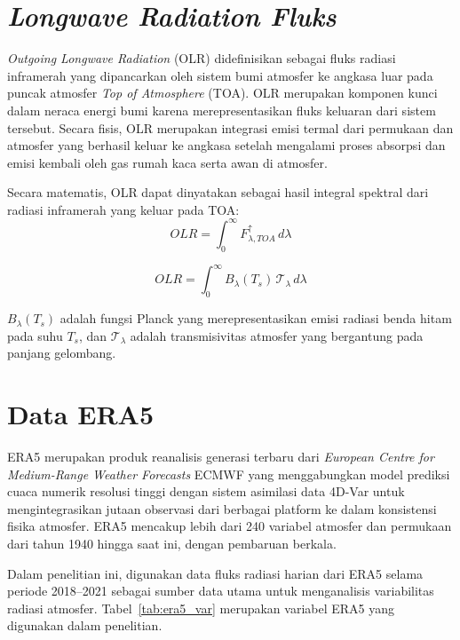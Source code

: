\documentclass[12pt,a4paper]{report}
\begin{document}
\section{\textit{Longwave Radiation Fluks}}

 
\textit{Outgoing Longwave Radiation} (OLR) didefinisikan sebagai fluks radiasi inframerah yang dipancarkan oleh sistem bumi atmosfer ke angkasa luar pada puncak atmosfer \textit{Top of Atmosphere} (TOA). OLR merupakan komponen kunci dalam neraca energi bumi karena merepresentasikan fluks keluaran dari sistem tersebut. Secara fisis, OLR merupakan integrasi emisi termal dari permukaan dan atmosfer yang berhasil keluar ke angkasa setelah mengalami proses absorpsi dan emisi kembali oleh gas rumah kaca serta awan di atmosfer.

Secara matematis, OLR dapat dinyatakan sebagai hasil integral spektral dari radiasi inframerah yang keluar pada TOA:
\begin{equation}
OLR = \int_{0}^{\infty} F^{\uparrow}_{\lambda, TOA} \, d\lambda
\end{equation}

\begin{equation}
OLR = \int_{0}^{\infty} B_{\lambda}(T_s)\,\mathcal{T}_{\lambda} \, d\lambda
\end{equation}

 $B_{\lambda}(T_s)$ adalah fungsi Planck yang merepresentasikan emisi radiasi benda hitam pada suhu $T_s$, dan $\mathcal{T}_{\lambda}$ adalah transmisivitas atmosfer yang bergantung pada panjang gelombang.
 
 
\section{Data ERA5 }
 
ERA5 merupakan produk reanalisis generasi terbaru dari  \textit{European Centre for Medium-Range Weather Forecasts} ECMWF yang menggabungkan model prediksi cuaca numerik resolusi tinggi dengan sistem asimilasi data 4D-Var
untuk mengintegrasikan jutaan observasi dari berbagai platform ke dalam
konsistensi fisika atmosfer. ERA5 mencakup lebih dari 240 variabel atmosfer dan
permukaan dari tahun 1940 hingga saat ini, dengan pembaruan berkala.
 
Dalam penelitian ini, digunakan data fluks radiasi harian dari ERA5 selama periode 2018–2021 sebagai sumber data utama untuk menganalisis variabilitas radiasi atmosfer. Tabel~\ref{tab:era5_var} merupakan variabel ERA5 yang digunakan dalam penelitian.
 
\end{document}
